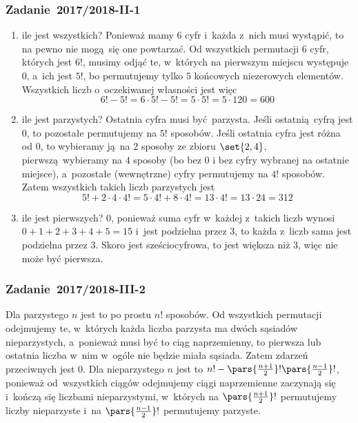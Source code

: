 \subsubsection*{Zadanie~2017/2018-II-1}
\begin{enumerate}[label={\alph*)}]
    \item ile jest wszystkich? Ponieważ mamy \(6\) cyfr i~każda z~nich musi wystąpić, to na pewno nie mogą się one powtarzać. Od wszystkich permutacji \(6\) cyfr, których jest \(6!\), musimy odjąć te, w~których na pierwszym miejscu występuje \(0\), a~ich jest \(5!\), bo permutujemy tylko \(5\) końcowych niezerowych elementów. Wszystkich liczb o~oczekiwanej własności jest więc
        \begin{equation*}
            6! - 5!
            = 6 \cdot 5! - 5!
            = 5 \cdot 5!
            = 5 \cdot 120
            = 600
        \end{equation*}
    \item ile jest parzystych? Ostatnia cyfra musi być parzysta. Jeśli ostatnią cyfrą jest \(0\), to pozostałe permutujemy na \(5!\) sposobów. Jeśli ostatnia cyfra jest różna od \(0\), to wybieramy ją na \(2\) sposoby ze zbioru \(\set{2, 4}\), pierwszą wybieramy na \(4\) sposoby (bo bez \(0\) i bez cyfry wybranej na ostatnie miejsce), a~pozostałe (wewnętrzne) cyfry permutujemy na \(4!\) sposobów. Zatem wszystkich takich liczb parzystych jest
        \begin{equation*}
            5! + 2 \cdot 4 \cdot 4!
            = 5 \cdot 4! + 8 \cdot 4!
            = 13 \cdot 4!
            = 13 \cdot 24
            = 312
        \end{equation*}
    \item ile jest pierwszych? \(0\), ponieważ suma cyfr w~każdej z~takich liczb wynosi \(0 + 1 + 2 + 3 + 4 + 5 = 15\) i~jest podzielna przez \(3\), to każda z~liczb sama jest podzielna przez \(3\). Skoro jest sześciocyfrowa, to jest większa niż \(3\), więc nie może być pierwsza.
\end{enumerate}
\subsubsection*{Zadanie~2017/2018-III-2}
Dla parzystego \(n\) jest to po prostu \(n!\) sposobów. Od wszystkich permutacji odejmujemy te, w~których każda liczba parzysta ma dwóch sąsiadów nieparzystych, a~ponieważ musi być to ciąg naprzemienny, to pierwsza lub ostatnia liczba w~nim w~ogóle nie będzie miała sąsiada. Zatem zdarzeń przeciwnych jest \(0\). Dla nieparzystego \(n\) jest to \(n! - \pars{\frac{n + 1}{2}}!\pars{\frac{n - 1}{2}}!\), ponieważ od~wszystkich ciągów odejmujemy ciągi naprzemienne zaczynają się i~kończą się liczbami nieparzystymi, w~których na \(\pars{\frac{n + 1}{2}}!\) permutujemy liczby nieparzyste i~na \(\pars{\frac{n - 1}{2}}!\) permutujemy parzyste.
